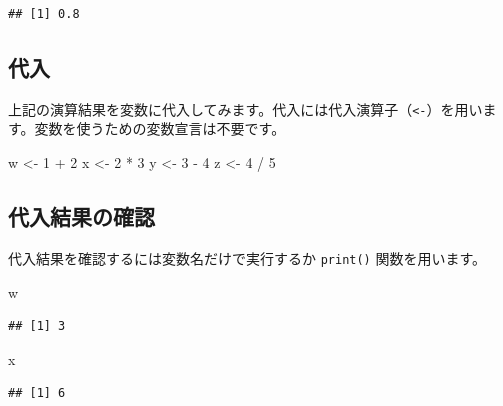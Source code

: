 \documentclass[
  12pt,
]{book}
\newenvironment{Shaded}{\begin{snugshade}}{\end{snugshade}}
\newcommand{\DecValTok}[1]{\textcolor[rgb]{0.00,0.00,0.81}{#1}}
\newcommand{\NormalTok}[1]{#1}
\newcommand{\OtherTok}[1]{\textcolor[rgb]{0.56,0.35,0.01}{#1}}
\newcommand{\SpecialCharTok}[1]{\textcolor[rgb]{0.00,0.00,0.00}{#1}}
\begin{document}
\begin{verbatim}
## [1] 0.8
\end{verbatim}

\hypertarget{ux4ee3ux5165}{%
\subsection{代入}\label{ux4ee3ux5165}}

上記の演算結果を変数に代入してみます。代入には代入演算子（\texttt{\textless{}-}）を用います。変数を使うための変数宣言は不要です。

\begin{Shaded}
\begin{Highlighting}[numbers=left,,]
\NormalTok{w }\OtherTok{\textless{}{-}} \DecValTok{1} \SpecialCharTok{+} \DecValTok{2}
\NormalTok{x }\OtherTok{\textless{}{-}} \DecValTok{2} \SpecialCharTok{*} \DecValTok{3}
\NormalTok{y }\OtherTok{\textless{}{-}} \DecValTok{3} \SpecialCharTok{{-}} \DecValTok{4}
\NormalTok{z }\OtherTok{\textless{}{-}} \DecValTok{4} \SpecialCharTok{/} \DecValTok{5}
\end{Highlighting}
\end{Shaded}

\hypertarget{ux4ee3ux5165ux7d50ux679cux306eux78baux8a8d}{%
\subsection{代入結果の確認}\label{ux4ee3ux5165ux7d50ux679cux306eux78baux8a8d}}

代入結果を確認するには変数名だけで実行するか \texttt{print()} 関数を用います。

\begin{Shaded}
\begin{Highlighting}[numbers=left,,]
\NormalTok{w}
\end{Highlighting}
\end{Shaded}

\begin{verbatim}
## [1] 3
\end{verbatim}

\begin{Shaded}
\begin{Highlighting}[numbers=left,,]
\NormalTok{x}
\end{Highlighting}
\end{Shaded}

\begin{verbatim}
## [1] 6
\end{verbatim}
\end{document}
